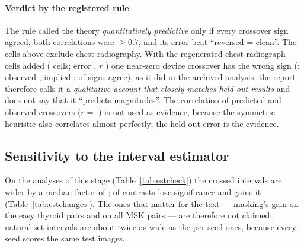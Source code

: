 \paragraph{Verdict by the registered rule} The rule called the theory \emph{quantitatively predictive} only if every
crossover sign agreed, both correlations were $\ge0.7$, and its error beat ``reversed = clean''. The cells above exclude
chest radiography. With the regenerated chest-radiograph cells added (\sFiveTCxrN{} cells; error \sFiveTCxrMae, $r$
\sFiveTCxrR) one near-zero device crossover has the wrong sign (\sFiveTCxrWrong: observed \sFiveTCxrWrongObs, implied
\sFiveTCxrWrongPred; \sFiveTCxrSign{} of \sFiveTCxrSignN{} signs agree), as it did in the archived analysis; the report
therefore calls it a \emph{qualitative account that closely matches held-out results} and does not say that it ``predicts magnitudes''. The
correlation of predicted and observed crossovers ($r=$ \sFiveTTwoR) is not used as evidence, because the symmetric
heuristic also correlates almost perfectly; the held-out error is the evidence.

\subsection{Sensitivity to the interval estimator}
On the analyses of this stage (Table~\ref{tab:estcheck}) the crossed intervals are wider by a median factor of
\sFiveEstMed; \sFiveEstLost{} of \sFiveEstN{} contrasts lose significance and \sFiveEstGained{} gains it
(Table~\ref{tab:estchanges}). The ones that matter for the text --- masking's gain on the easy thyroid pairs and on all MSK
pairs --- are therefore not claimed; natural-set intervals are about twice as wide as the per-seed ones, because every seed
scores the same test images.



